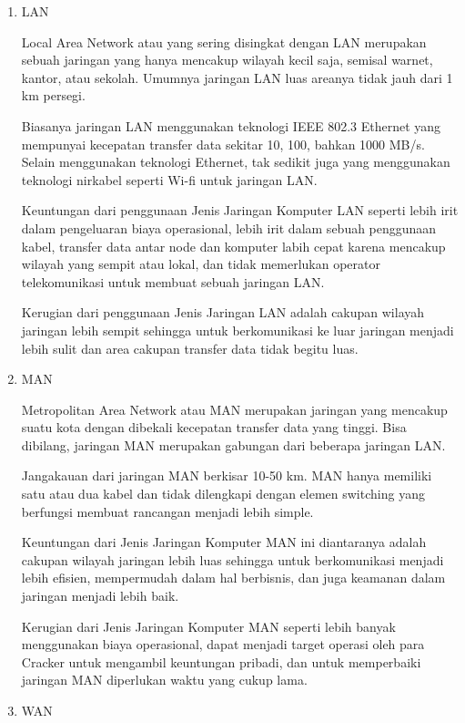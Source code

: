 \begin{enumerate}
\item LAN \par
Local Area Network atau yang sering disingkat dengan LAN merupakan sebuah jaringan yang hanya mencakup wilayah kecil saja, semisal warnet, kantor, atau sekolah. Umumnya jaringan LAN luas areanya tidak jauh dari 1 km persegi. \par
\vspace{12pt}
Biasanya jaringan LAN menggunakan teknologi IEEE 802.3 Ethernet yang mempunyai kecepatan transfer data sekitar 10, 100, bahkan 1000 MB/s. Selain menggunakan teknologi Ethernet, tak sedikit juga yang menggunakan teknologi nirkabel seperti Wi-fi untuk jaringan LAN. \par
\vspace{12pt}
Keuntungan dari penggunaan Jenis Jaringan Komputer LAN seperti lebih irit dalam pengeluaran biaya operasional, lebih irit dalam sebuah  penggunaan kabel, transfer data antar node dan komputer labih cepat karena mencakup wilayah yang sempit atau lokal, dan tidak memerlukan operator telekomunikasi untuk membuat sebuah jaringan LAN. \par
Kerugian dari penggunaan Jenis Jaringan LAN adalah cakupan wilayah jaringan lebih sempit sehingga untuk berkomunikasi ke luar jaringan menjadi lebih sulit dan area cakupan transfer data tidak begitu luas. \par
\vspace{12pt}
\noindent 
\item MAN \par
Metropolitan Area Network atau MAN merupakan jaringan yang mencakup suatu kota dengan dibekali kecepatan transfer data yang tinggi. Bisa dibilang, jaringan MAN merupakan gabungan dari beberapa jaringan LAN. \par
\vspace{12pt}
Jangakauan dari jaringan MAN berkisar 10-50 km. MAN hanya memiliki satu atau dua kabel dan tidak dilengkapi dengan elemen switching yang berfungsi membuat rancangan menjadi lebih simple. \par
\vspace{12pt}
Keuntungan dari Jenis Jaringan Komputer MAN ini diantaranya adalah cakupan wilayah jaringan lebih luas sehingga untuk berkomunikasi menjadi lebih efisien, mempermudah dalam hal berbisnis, dan juga keamanan dalam jaringan menjadi lebih baik. \par
\vspace{12pt}
Kerugian dari Jenis Jaringan Komputer MAN seperti lebih banyak menggunakan biaya operasional, dapat menjadi target operasi oleh para Cracker untuk mengambil keuntungan pribadi, dan untuk memperbaiki jaringan MAN diperlukan waktu yang cukup lama. \par
\vspace{12pt}
\noindent 
\item WAN\end{enumerate}
